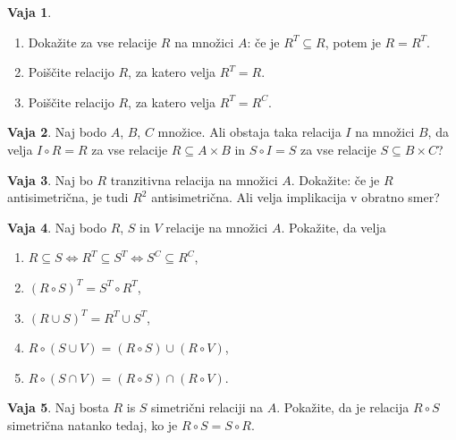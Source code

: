 \documentclass{article}
\theoremstyle{definition}
\newtheorem{vaja}{Vaja}
\begin{document}
\begin{vaja}
  \
  \begin{enumerate}
    \item Dokažite za vse relacije $R$ na množici $A$: če je $R^T \subseteq R$, potem je $R = R^T$.
    \item Poiščite relacijo $R$, za katero velja $R^T = R$.
    \item Poiščite relacijo $R$, za katero velja $R^T = R^C$. %
  \end{enumerate}
\end{vaja}

\begin{vaja}
  Naj bodo $A$, $B$, $C$ množice. Ali obstaja taka relacija $I$ na množici $B$, da velja $I \circ R = R$ za vse relacije $R \subseteq A \times B$ in $S \circ I = S$ za vse relacije $S \subseteq B \times C$?
\end{vaja}

\begin{vaja}
  Naj bo $R$ tranzitivna relacija na množici $A$. Dokažite: če je $R$ antisimetrična, je tudi $R^2$ antisimetrična. Ali velja implikacija v obratno smer?
\end{vaja}

\begin{vaja}
  Naj bodo $R$, $S$ in $V$ relacije na množici $A$. Pokažite, da velja
  \begin{enumerate}
    \item $R \subseteq S \iff R^T \subseteq S^T \iff S^C \subseteq R^C$,
    \item $(R \circ S)^T = S^T \circ R^T$,
    \item $(R \cup S)^T = R^T \cup S^T$,
    \item $R \circ (S \cup V) = (R \circ S) \cup (R \circ V)$,
    \item $R \circ (S \cap V) = (R \circ S) \cap (R \circ V)$.
  \end{enumerate}
\end{vaja}

\begin{vaja}
  Naj bosta $R$ is $S$ simetrični relaciji na $A$. Pokažite, da je relacija $R \circ S$ simetrična natanko tedaj, ko je $R \circ S = S \circ R$.
\end{vaja}
\end{document}
